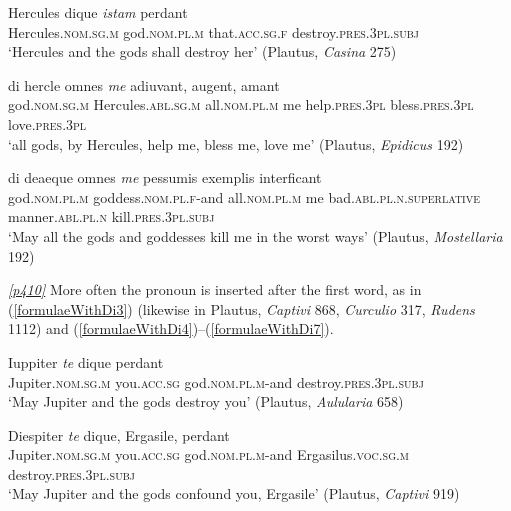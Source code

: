 \begin{exe}
\ex
\gll Hercules dique \emph{istam} perdant\\
Hercules.\textsc{nom.sg.m} god.\textsc{nom.pl.m}
that.\textsc{acc.sg.f} destroy.\textsc{pres.3pl.subj}\\
\trans `Hercules and the gods shall destroy her' (Plautus, \textit{Casina} 275)
\label{pronounInserted5}
\end{exe}

\begin{exe}
\ex
\gll di hercle omnes \emph{me} adiuvant, augent, amant\\
god.\textsc{nom.sg.m} Hercules.\textsc{abl.sg.m} all.\textsc{nom.pl.m} me help.\textsc{pres.3pl} bless.\textsc{pres.3pl} love.\textsc{pres.3pl}\\
\trans `all gods, by Hercules, help me, bless me, love me' (Plautus, \textit{Epidicus} 192)
\label{formulaeWithDi1}
\end{exe}

\begin{exe}
\ex
\gll di deaeque omnes \emph{me} pessumis exemplis interficant\\
god.\textsc{nom.pl.m} goddess.\textsc{nom.pl.f}-and all.\textsc{nom.pl.m} me bad.\textsc{abl.pl.n.superlative} manner.\textsc{abl.pl.n} kill.\textsc{pres.3pl.subj}\\
\trans `May all the gods and goddesses kill me in the worst ways' (Plautus, \textit{Mostellaria} 192)
\label{formulaeWithDi2}
\end{exe}

\hyperlink{p410}{\emph{[p410]}} More often the pronoun is inserted after the first word, as in (\ref{formulaeWithDi3}) (likewise in Plautus, \textit{Captivi} 868, \textit{Curculio} 317, \textit{Rudens} 1112) and (\ref{formulaeWithDi4})--(\ref{formulaeWithDi7}).

\begin{exe}
\ex
\gll Iuppiter \emph{te} dique perdant\\
Jupiter.\textsc{nom.sg.m} you.\textsc{acc.sg} god.\textsc{nom.pl.m}-and destroy.\textsc{pres.3pl.subj}\\
\trans `May Jupiter and the gods destroy you' (Plautus, \textit{Aulularia} 658)
\label{formulaeWithDi3}
\end{exe}

\begin{exe}
\ex
\gll Diespiter \emph{te} dique, Ergasile, perdant\\
Jupiter.\textsc{nom.sg.m} you.\textsc{acc.sg} god.\textsc{nom.pl.m}-and Ergasilus.\textsc{voc.sg.m} destroy.\textsc{pres.3pl.subj}\\
\trans `May Jupiter and the gods confound you, Ergasile' (Plautus, \textit{Captivi} 919)
\label{formulaeWithDi4}
\end{exe}

